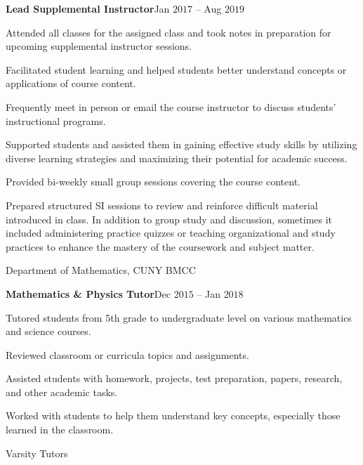 \documentclass[a4paper, 12pt]{article}
\begin{document}
\begin{flushleft}
\begin{flushleft}
\textbf{Lead Supplemental Instructor}\hfill Jan $2017$ -- Aug $2019$\\
\begin{compactitem}
    \item Attended all classes for the assigned class and took notes in preparation for upcoming supplemental instructor sessions.
    \item Facilitated student learning and helped students better understand concepts or applications of course content.
    \item Frequently meet in person or email the course instructor to discuss students' instructional programs.
    \item Supported students and assisted them in gaining effective study skills by utilizing diverse learning strategies and maximizing their potential for academic success.
    \item Provided bi-weekly small group sessions covering the course content.
    \item Prepared structured SI sessions to review and reinforce difficult material introduced in class. In addition to group study and discussion, sometimes it included administering practice quizzes or teaching organizational and study practices to enhance the mastery of the coursework and subject matter.
\end{compactitem}
Department of Mathematics, CUNY BMCC
\end{flushleft}

\begin{flushleft}
\textbf{Mathematics \& Physics Tutor}\hfill Dec $2015$ -- Jan $2018$\\
\begin{compactitem}
    \item Tutored students from 5th grade to undergraduate level on various mathematics and science courses.
    \item Reviewed classroom or curricula topics and assignments.
    \item Assisted students with homework, projects, test preparation, papers, research, and other academic tasks.
    \item Worked with students to help them understand key concepts, especially those learned in the classroom.
\end{compactitem}
Varsity Tutors
\end{flushleft}


\end{flushleft}
\end{document}

